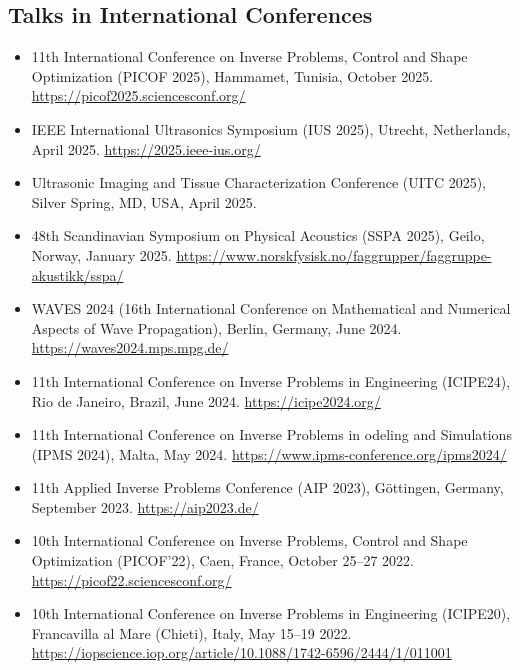 \documentclass[10pt]{article}
\begin{document}
\subsection{Talks in International Conferences}
\begin{itemize}
\item 11th International Conference on Inverse Problems, Control and Shape Optimization (PICOF 2025), Hammamet, Tunisia, October 2025. \url{https://picof2025.sciencesconf.org/}
\item IEEE International Ultrasonics Symposium (IUS 2025), Utrecht, Netherlands, April 2025. \url{https://2025.ieee-ius.org/}
\item Ultrasonic Imaging and Tissue Characterization Conference (UITC 2025), Silver Spring, MD, USA, April 2025.
\item 48th Scandinavian Symposium on Physical Acoustics (SSPA 2025), Geilo, Norway, January 2025. \url{https://www.norskfysisk.no/faggrupper/faggruppe-akustikk/sspa/}
\item WAVES 2024 (16th International Conference on Mathematical and Numerical Aspects of Wave Propagation), Berlin, Germany, June 2024. \url{https://waves2024.mps.mpg.de/}
\item 11th International Conference on Inverse Problems in Engineering (ICIPE24), Rio de Janeiro, Brazil, June 2024. \url{https://icipe2024.org/}
\item 11th International Conference on Inverse Problems in odeling and Simulations (IPMS 2024), Malta, May 2024. \url{https://www.ipms-conference.org/ipms2024/}
\item 11th Applied Inverse Problems Conference (AIP 2023), Göttingen, Germany, September 2023. \url{https://aip2023.de/}
\item 10th International Conference on Inverse Problems, Control and Shape Optimization (PICOF'22), Caen, France, October 25--27 2022. \url{https://picof22.sciencesconf.org/}
\item 10th International Conference on Inverse Problems in Engineering (ICIPE20), Francavilla al Mare (Chieti), Italy, May 15--19 2022. \url{https://iopscience.iop.org/article/10.1088/1742-6596/2444/1/011001}
\end{itemize}
\end{document}
